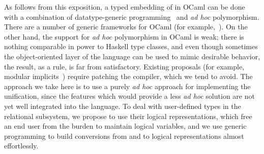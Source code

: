 As follows from this exposition, a typed embedding of \miniKanren in OCaml can be done with
a combination of datatype-generic programming~\cite{DGP} and \emph{ad hoc} polymorphism. There are a
number of generic frameworks for OCaml (for example,~\cite{Deriving}). On the other hand, the support
for \emph{ad hoc} polymorphism in OCaml is weak; there is nothing comparable in power to Haskell
type classes, and even though sometimes the object-oriented layer of the language can be used to mimic
desirable behavior, the result, as a rule, is far from satisfactory. Existing proposals (for example,
modular implicits~\cite{Implicits}) require patching the compiler, which we tend to avoid.
The approach we take here is to use a purely \emph{ad hoc} approach for implementing the unification, since the features
which would provide a less \emph{ad hoc} solution are not yet well integrated into the language. To deal
with user-defined types in the relational subsystem, we propose to use their logical representations, which free an end user
from the burden to maintain logical variables, and we use generic programming to build conversions from and to logical
representations almost effortlessly.



